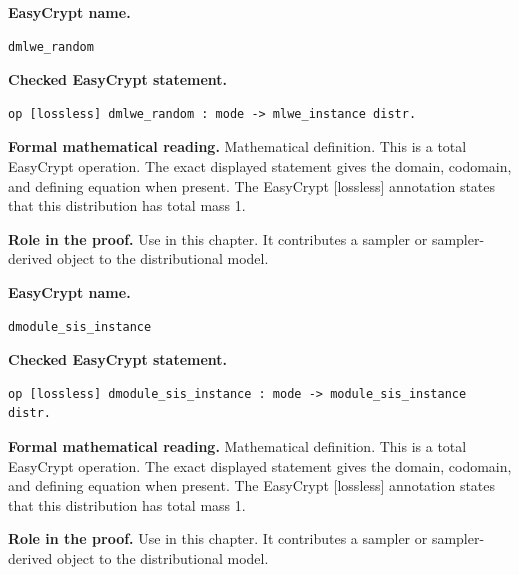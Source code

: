 \begin{formaldefinition}
\noindent\textbf{EasyCrypt name.}
\begin{lstlisting}[language=EasyCrypt,basicstyle=\ttfamily\scriptsize]
dmlwe_random
\end{lstlisting}
\noindent\textbf{Checked EasyCrypt statement.}
\begin{lstlisting}[language=EasyCrypt,basicstyle=\ttfamily\scriptsize]
op [lossless] dmlwe_random : mode -> mlwe_instance distr.
\end{lstlisting}
\noindent\textbf{Formal mathematical reading.}
Mathematical definition. This is a total EasyCrypt operation.  The exact displayed statement gives the domain, codomain, and defining equation when present.  The EasyCrypt [lossless] annotation states that this distribution has total mass 1.

\noindent\textbf{Role in the proof.}
Use in this chapter. It contributes a sampler or sampler-derived object to the distributional model.

\end{formaldefinition}

\begin{formaldefinition}
\noindent\textbf{EasyCrypt name.}
\begin{lstlisting}[language=EasyCrypt,basicstyle=\ttfamily\scriptsize]
dmodule_sis_instance
\end{lstlisting}
\noindent\textbf{Checked EasyCrypt statement.}
\begin{lstlisting}[language=EasyCrypt,basicstyle=\ttfamily\scriptsize]
op [lossless] dmodule_sis_instance : mode -> module_sis_instance distr.
\end{lstlisting}
\noindent\textbf{Formal mathematical reading.}
Mathematical definition. This is a total EasyCrypt operation.  The exact displayed statement gives the domain, codomain, and defining equation when present.  The EasyCrypt [lossless] annotation states that this distribution has total mass 1.

\noindent\textbf{Role in the proof.}
Use in this chapter. It contributes a sampler or sampler-derived object to the distributional model.

\end{formaldefinition}

